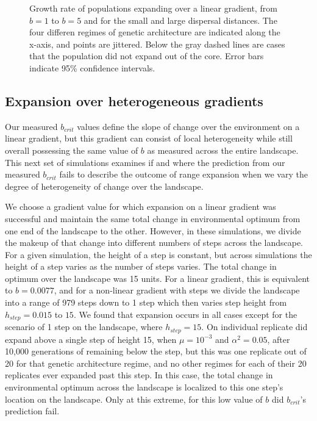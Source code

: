 \begin{figure}[h]
\centering
{}
\caption[Growth rate of populations expanding over a linear gradient.]{Growth rate of populations expanding over a linear gradient, from $b = 1$ to $b = 5$ and for the small and large dispersal distances. The four differen regimes of genetic architecture are indicated along the x-axis, and points are jittered. Below the gray dashed lines are cases that the population did not expand out of the core. Error bars indicate 95\% confidence intervals.}
\label{fig:linearspeed}
\end{figure}



\subsection{Expansion over heterogeneous gradients}

Our measured $b_{crit}$ values define the slope of change over the environment on a linear gradient, but this gradient can consist of local heterogeneity while still overall possessing the same value of $b$ as measured across the entire landscape. This next set of simulations examines if and where the prediction from our measured $b_{crit}$ fails to describe the outcome of range expansion when we vary the degree of heterogeneity of change over the landscape. 

We choose a gradient value for which expansion on a linear gradient was successful and maintain the same total change in environmental optimum from one end of the landscape to the other. However, in these simulations, we divide the makeup of that change into different numbers of steps across the landscape. For a given simulation, the height of a step is constant, but across simulations the height of a step varies as the number of steps varies. The total change in optimum over the landscape was 15 units. For a linear gradient, this is equivalent to $b = 0.0077$, and for a non-linear gradient with steps we divide the landscape into a range of 979 steps down to 1 step which then varies step height from $h_{step} = 0.015$ to $15$. We found that expansion occurs in all cases except for the scenario of 1 step on the landscape, where $h_{step} = 15$. On individual replicate did expand above a single step of height 15, when $\mu = 10^{-3}$ and $\alpha^2 = 0.05$, after 10,000 generations of remaining below the step, but this was one replicate out of 20 for that genetic architecture regime, and no other regimes for each of their 20 replicates ever expanded past this step. In this case, the total change in environmental optimum across the landscape is localized to this one step's location on the landscape. Only at this extreme, for this low value of $b$ did $b_{crit}$'s prediction fail. %

